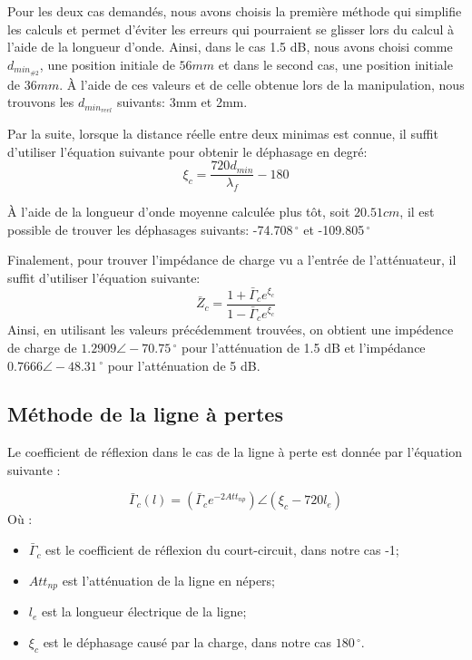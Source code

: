 Pour les deux cas demandés, nous avons choisis la première méthode qui simplifie les calculs et permet d'éviter les erreurs qui pourraient se glisser lors du calcul à l'aide de la longueur d'onde. Ainsi, dans le cas 1.5 dB, nous avons choisi comme $d_{min_{\#2}}$, une position initiale de $56mm$ et dans le second cas, une position initiale de $36mm$. À l'aide de ces valeurs et de celle obtenue lors de la manipulation, nous trouvons les $d_{min_{reel}}$ suivants: 3mm et 2mm.

Par la suite, lorsque la distance réelle entre deux minimas est connue, il suffit d'utiliser l'équation suivante pour obtenir le déphasage en degré:
\begin{equation}
    \xi_c = \frac{720d_{min}}{\lambda_f}-180
\end{equation}

À l'aide de la longueur d'onde moyenne calculée plus tôt, soit $20.51cm$, il est possible de trouver les déphasages suivants: -74.708$\,^{\circ}$ et -109.805$\,^{\circ}$

Finalement, pour trouver l'impédance de charge vu a l'entrée de l'atténuateur, il suffit d'utiliser l'équation suivante:
\begin{equation}
\label{eq:eq6}
    \bar{Z}_c = \frac{1+\bar{\Gamma}_c e^{\xi_c}}{1-\bar{\Gamma}_c e^{\xi_c}}
\end{equation}
Ainsi, en utilisant les valeurs précédemment trouvées, on obtient une impédence de charge de $1.2909 \angle -70.75\,^{\circ}$ pour l'atténuation de 1.5 dB et l'impédance $0.7666 \angle -48.31\,^{\circ}$ pour l'atténuation de 5 dB.

\subsection{Méthode de la ligne à pertes}
Le coefficient de réflexion dans le cas de la ligne à perte est donnée par l'équation suivante :

\begin{equation}
\label{eq:eq5}
     \bar{\Gamma}_c(l) =  (\bar{\Gamma}_c e^{-2Att_{np}}) \angle (\xi_c - 720l_e)
\end{equation}
Où :
\begin{itemize}
    \item $\bar{\Gamma}_c$ est le coefficient de réflexion du court-circuit, dans notre cas -1;
    \item $Att_{np}$ est l'atténuation de la ligne en népers;
    \item $l_e$ est la longueur électrique de la ligne;
    \item $\xi_c$ est le déphasage causé par la charge, dans notre cas $180\,^{\circ}$.
\end{itemize}

